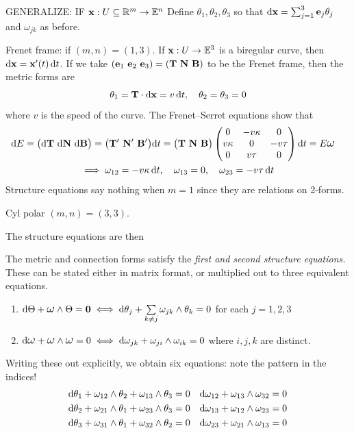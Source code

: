 \begin{exercises}{}{}
\begin{enumerate}
\end{enumerate}
\end{exercises}

\iffalse
\clearpage

GENERALIZE: IF ${\mathbf{x}}:U\subseteq\mathbb{R}^m\to\mathbb{E}^n$ Define $\theta_1,\theta_2,\theta_3$ so that $\mathrm{d}{\mathbf{x}}=\sum_{j=1}^3{\mathbf{e}}_j\theta_j$ and $\omega_{jk}$ as before.

\begin{examples}{}{}
Frenet frame: if $(m,n)=(1,3)$. If ${\mathbf{x}}:U\to\mathbb{E}^3$ is a biregular curve, then $\mathrm{d}{\mathbf{x}}={\mathbf{x}}'(t)\,{\mathrm{d} t}$. If we take $({\mathbf{e}}_1\ {\mathbf{e}}_2\ {\mathbf{e}}_3)=({\mathbf{T}}\ {\mathbf{N}}\ {\mathbf{B}})$ to be the Frenet frame, then the metric forms are
	\[\theta_1={\mathbf{T}}\cdot\mathrm{d}{\mathbf{x}}=v\,{\mathrm{d} t},\quad \theta_2=\theta_3=0\]
	where $v$ is the speed of the curve. The Frenet--Serret equations show that
	\begin{gather*}
	\begin{aligned}
	\D E&=\bigl(\D\vT\ \D\vN\ \D\vB\bigr)=\bigl(\vT'\ \vN'\ \vB'\bigr)\dt =\bigl(\vT\ \vN\ \vB\bigr)
	\begin{pmatrix}
		0&-v\kappa&0\\
		v\kappa&0&-v\tau\\
		0&v\tau&0
	\end{pmatrix}\dt =E\lomega
	\end{aligned}
	\\
	\implies \omega_{12}=-v\kappa\,\dt,\quad \omega_{13}=0,\quad \omega_{23}=-v\tau\,\dt
	\end{gather*}
	Structure equations say nothing when $m=1$ since they are relations on 2-forms.

Cyl polar $(m,n)=(3,3)$. 
\end{examples}

 The structure equations are then

\begin{thm}{}{}
The metric and connection forms satisfy the \emph{first and second structure equations.} These can be stated either in matrix format, or multiplied out to three equivalent equations.
\begin{enumerate}
  \item $\D\Theta+\lomega\wedge\Theta=\V0\iff \D\theta_j+\sum\limits_{k\neq j}\omega_{jk}\wedge\theta_k=0$ for each $j=1,2,3$
  \item $\D\lomega+\lomega\wedge\lomega=0\iff \D\omega_{jk}+\omega_{ji}\wedge\omega_{ik}=0$ where $i,j,k$ are distinct.
\end{enumerate}
Writing these out explicitly, we obtain six equations: note the pattern in the indices!
\begin{align*}
&\mathrm{d}\theta_1+\omega_{12}\wedge\theta_2+\omega_{13}\wedge\theta_3=0 &&\mathrm{d}\omega_{12}+\omega_{13}\wedge\omega_{32}=0\\
&\mathrm{d}\theta_2+\omega_{21}\wedge\theta_1+\omega_{23}\wedge\theta_3=0 &&\mathrm{d}\omega_{13}+\omega_{12}\wedge\omega_{23}=0\\
&\mathrm{d}\theta_3+\omega_{31}\wedge\theta_1+\omega_{32}\wedge\theta_2=0 &&\mathrm{d}\omega_{23}+\omega_{21}\wedge\omega_{13}=0
\end{align*}
\end{thm}

